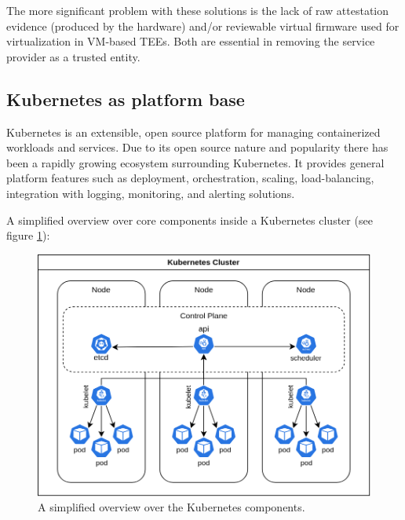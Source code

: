 The more significant problem with these solutions is the lack of raw attestation
evidence (produced by the hardware) and/or reviewable virtual firmware used for
virtualization in VM-based TEEs. Both are essential in removing the service
provider as a trusted entity.

\subsection{Kubernetes as platform base}
\label{sec:kubernetes-platform-base}

Kubernetes is an extensible, open source platform for managing containerized
workloads and services. Due to its open source nature and popularity there has
been a rapidly growing ecosystem surrounding Kubernetes. It provides general
platform features such as deployment, orchestration, scaling, load-balancing,
integration with logging, monitoring, and alerting solutions.

A simplified overview over core components inside a Kubernetes cluster (see
figure \ref{fig:kubernetes-overview}):

\begin{figure}
  \centering
  \includegraphics{resources/kubernetes-overview.png}
  \caption{A simplified overview over the Kubernetes components.}
  \label{fig:kubernetes-overview}
\end{figure}

